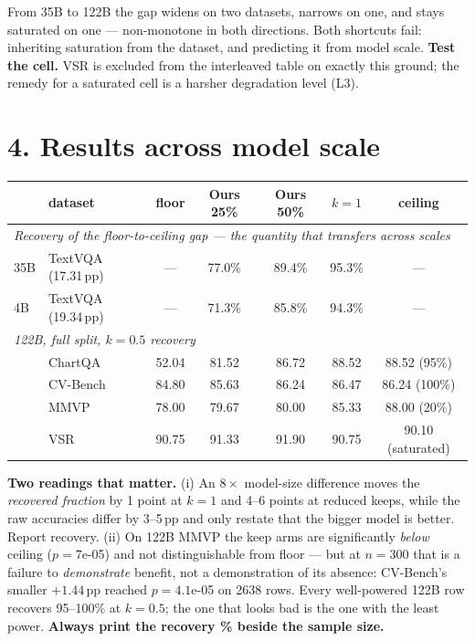 \documentclass[10pt]{article}
\newcommand{\hh}[1]{\textbf{#1}}
\begin{document}
\noindent From 35B to 122B the gap widens on two datasets, narrows on one, and stays saturated on
one --- non-monotone in both directions. Both shortcuts fail: inheriting saturation from the
dataset, and predicting it from model scale. \hh{Test the cell.} VSR is excluded from the
interleaved table on exactly this ground; the remedy for a saturated cell is a harsher degradation
level (L3).

\section*{4. Results across model scale}

\begin{table}[h]\centering\small
\begin{tabular}{llccccc}
\toprule
 & dataset & floor & Ours 25\% & Ours 50\% & $k{=}1$ & ceiling \\
\midrule
\multicolumn{7}{l}{\emph{Recovery of the floor-to-ceiling gap --- the quantity that transfers across scales}}\\
35B & TextVQA (17.31\,pp) & --- & 77.0\% & 89.4\% & 95.3\% & --- \\
4B  & TextVQA (19.34\,pp) & --- & 71.3\% & 85.8\% & 94.3\% & --- \\
\midrule
\multicolumn{7}{l}{\emph{122B, full split, $k{=}0.5$ recovery}}\\
    & ChartQA  & 52.04 & 81.52 & 86.72 & 88.52 & 88.52 \quad(95\%) \\
    & CV-Bench & 84.80 & 85.63 & 86.24 & 86.47 & 86.24 \quad(100\%) \\
    & MMVP     & 78.00 & 79.67 & 80.00 & 85.33 & 88.00 \quad(20\%) \\
    & VSR      & 90.75 & 91.33 & 91.90 & 90.75 & 90.10 \quad(saturated) \\
\bottomrule
\end{tabular}
\end{table}

\noindent\textbf{Two readings that matter.} (i) An $8\times$ model-size difference moves the
\emph{recovered fraction} by 1 point at $k{=}1$ and 4--6 points at reduced keeps, while the raw
accuracies differ by 3--5\,pp and only restate that the bigger model is better. Report recovery.
(ii) On 122B MMVP the keep arms are significantly \emph{below} ceiling ($p{=}7$e-05) and not
distinguishable from floor --- but at $n{=}300$ that is a failure to \emph{demonstrate} benefit,
not a demonstration of its absence: CV-Bench's smaller $+1.44$\,pp reached $p{=}4.1$e-05 on 2638
rows. Every well-powered 122B row recovers 95--100\% at $k{=}0.5$; the one that looks bad is the
one with the least power. \hh{Always print the recovery \% beside the sample size.}
\end{document}
